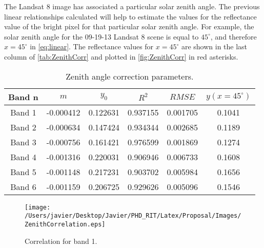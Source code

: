 The Landsat 8 image has associated a particular solar zenith angle. The previous linear relationships calculated will help to estimate the values for the reflectance value of the bright pixel for that particular solar zenith angle. For example, the solar zenith angle for the 09-19-13 Landsat 8 scene is equal to $45^\circ$, and therefore $x=45^\circ$ in \autoref{eq:linear}. The reflectance values for $x=45^\circ$ are shown in the last column of \autoref{tab:ZenithCorr} and plotted in \autoref{fig:ZenithCorr} in red asterisks.
\vspace{.5cm}
\begin{table}[!ht]
\caption{ Zenith angle correction parameters. \label{tab:ZenithCorr} } 
\centering
\begin{tabular}{c|c|c|c|c|c} 
 \bfseries{Band n} & \bfseries{$m$}      & \bfseries{$y_0$}    & \bfseries{$R^2$}     & \bfseries{$RMSE$} & $y(x=45^\circ)$   \\ \hline \hline
 Band 1 & -0.000412 & 0.122631 & 0.937155 & 0.001705 &  0.1041\\
 Band 2 & -0.000634 & 0.147424 & 0.934344 & 0.002685 &  0.1189\\
 Band 3 & -0.000756 & 0.161421 & 0.976599 & 0.001869 &  0.1274\\
 Band 4 & -0.001316 & 0.220031 & 0.906946 & 0.006733 &  0.1608\\
 Band 5 & -0.001148 & 0.217231 & 0.903702 & 0.005984 &  0.1656\\
 Band 6 & -0.001159 & 0.206725 & 0.929626 & 0.005096 &  0.1546\\  
 \end{tabular}
\end{table}

\begin{figure}[htb]
  	\centering
  	\texttt{[image: /Users/javier/Desktop/Javier/PHD\_RIT/Latex/Proposal/Images/ZenithCorrelation.eps]}
  \caption{Correlation for band 1. \label{fig:Band1Corr} } 
\end{figure}

